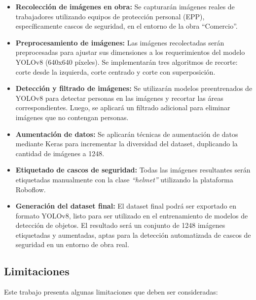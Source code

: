 \begin{itemize}
  \item \textbf{Recolección de imágenes en obra:} Se capturarán imágenes reales de trabajadores utilizando equipos de protección personal (EPP), específicamente cascos de seguridad, en el entorno de la obra ``Comercio''.
  \item \textbf{Preprocesamiento de imágenes:} Las imágenes recolectadas serán preprocesadas para ajustar sus dimensiones a los requerimientos del modelo YOLOv8 (640x640 píxeles). Se implementarán tres algoritmos de recorte: corte desde la izquierda, corte centrado y corte con superposición.
  \item \textbf{Detección y filtrado de imágenes:} Se utilizarán modelos preentrenados de YOLOv8 para detectar personas en las imágenes y recortar las áreas correspondientes. Luego, se aplicará un filtrado adicional para eliminar imágenes que no contengan personas.
  \item \textbf{Aumentación de datos:} Se aplicarán técnicas de aumentación de datos mediante Keras para incrementar la diversidad del dataset, duplicando la cantidad de imágenes a 1248.
  \item \textbf{Etiquetado de cascos de seguridad:} Todas las imágenes resultantes serán etiquetadas manualmente con la clase \textit{``helmet''} utilizando la plataforma Roboflow.
  \item \textbf{Generación del dataset final:} El dataset final podrá ser exportado en formato YOLOv8, listo para ser utilizado en el entrenamiento de modelos de detección de objetos. El resultado será un conjunto de 1248 imágenes etiquetadas y aumentadas, aptas para la detección automatizada de cascos de seguridad en un entorno de obra real.
\end{itemize}

\subsection{Limitaciones}

Este trabajo presenta algunas limitaciones que deben ser consideradas:

